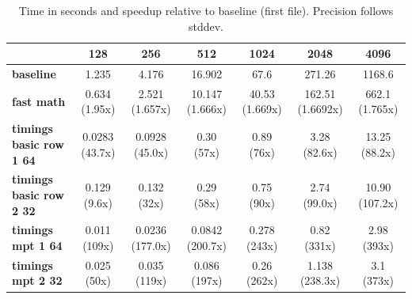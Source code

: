 \begin{table}[H]
\centering
\begin{tabular}{|l|c|c|c|c|c|c|}
\hline
 & \textbf{128} & \textbf{256} & \textbf{512} & \textbf{1024} & \textbf{2048} & \textbf{4096} \\
\hline
\textbf{baseline} 
& 1.235
& 4.176
& 16.902
& 67.6
& 271.26
& 1168.6 \\

\textbf{fast math} 
& 0.634 (1.95x)
& 2.521 (1.657x)
& 10.147 (1.666x)
& 40.53 (1.669x)
& 162.51 (1.6692x)
& 662.1 (1.765x) \\

\textbf{timings basic row 1 64} 
& 0.0283 (43.7x)
& 0.0928 (45.0x)
& 0.30 (57x)
& 0.89 (76x)
& 3.28 (82.6x)
& 13.25 (88.2x) \\

\textbf{timings basic row 2 32} 
& 0.129 (9.6x)
& 0.132 (32x)
& 0.29 (58x)
& 0.75 (90x)
& 2.74 (99.0x)
& 10.90 (107.2x) \\

\textbf{timings mpt 1 64} 
& 0.011 (109x)
& 0.0236 (177.0x)
& 0.0842 (200.7x)
& 0.278 (243x)
& 0.82 (331x)
& 2.98 (393x) \\

\textbf{timings mpt 2 32} 
& 0.025 (50x)
& 0.035 (119x)
& 0.086 (197x)
& 0.26 (262x)
& 1.138 (238.3x)
& 3.1 (373x) \\

\hline
\end{tabular}
\caption{Time in seconds and speedup relative to baseline (first file). Precision follows stddev.}
\end{table}

